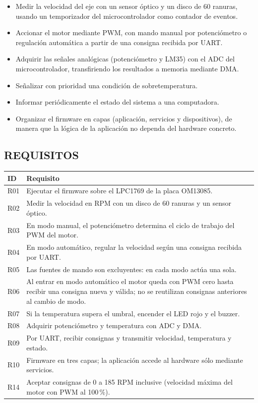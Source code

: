 \begin{itemize}
  \item Medir la velocidad del eje con un sensor óptico y un disco de 60 ranuras,
  usando un temporizador del microcontrolador como contador de eventos.
  \item Accionar el motor mediante PWM, con mando manual por potenciómetro o regulación
  automática a partir de una consigna recibida por UART.
  \item Adquirir las señales analógicas (potenciómetro y LM35) con el ADC del
  microcontrolador, transfiriendo los resultados a memoria mediante DMA.
  \item Señalizar con prioridad una condición de sobretemperatura.
  \item Informar periódicamente el estado del sistema a una computadora.
  \item Organizar el firmware en capas (aplicación, servicios y dispositivos), de manera
  que la lógica de la aplicación no dependa del hardware concreto.
\end{itemize}

\subsection{REQUISITOS}

\begin{longtable}{|p{1.2cm}|p{12.4cm}|}
\hline
\textbf{ID} & \textbf{Requisito} \\ \hline
\endhead
R01 & Ejecutar el firmware sobre el LPC1769 de la placa OM13085. \\ \hline
R02 & Medir la velocidad en RPM con un disco de 60 ranuras y un sensor óptico. \\ \hline
R03 & En modo manual, el potenciómetro determina el ciclo de trabajo del PWM del motor. \\ \hline
R04 & En modo automático, regular la velocidad según una consigna recibida por UART. \\ \hline
R05 & Las fuentes de mando son excluyentes: en cada modo actúa una sola. \\ \hline
R06 & Al entrar en modo automático el motor queda con PWM cero hasta recibir una consigna
nueva y válida; no se reutilizan consignas anteriores al cambio de modo. \\ \hline
R07 & Si la temperatura supera el umbral, encender el LED rojo y el buzzer. \\ \hline
R08 & Adquirir potenciómetro y temperatura con ADC y DMA. \\ \hline
R09 & Por UART, recibir consignas y transmitir velocidad, temperatura y estado. \\ \hline
R10 & Firmware en tres capas; la aplicación accede al hardware sólo mediante servicios. \\ \hline
R14 & Aceptar consignas de 0 a 185 RPM inclusive (velocidad máxima del motor con PWM al
100\,\%). \\ \hline
\end{longtable}

